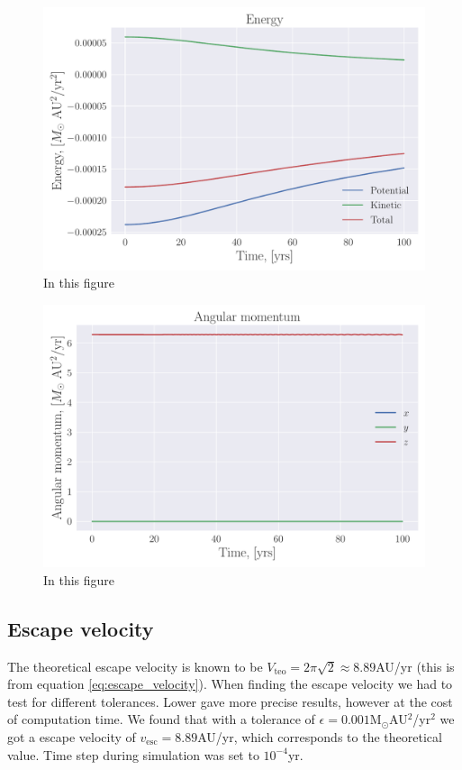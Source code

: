 \documentclass[reprint, english,notitlepage,nofootinbib]{revtex4-1}  %
\begin{document}
\begin{figure}[h]
	\centering
	\includegraphics[width=\linewidth]{../output/earth_sun_circ-verlet-3-5-3_energy.pdf}
	\caption{In this figure 
		\label{fig:betha=3_energy}}
\end{figure}

\begin{figure}[h]
	\centering
	\includegraphics[width=\linewidth]{../output/earth_sun_circ-verlet-3-5-3_ang_mom.pdf}
	\caption{In this figure 
		\label{fig:4}}
\end{figure}

\subsection{Escape velocity}
The theoretical escape velocity is known to be $V_{\text{teo}} = 2\pi\sqrt{2} \approx 8.89$AU/yr (this is from equation \eqref{eq:escape_velocity}). When finding the escape velocity we had to test for different tolerances. Lower gave more precise results, however at the cost of computation time. We found that with a tolerance of $\epsilon = 0.001$M$_\odot$AU$^2$/yr$^2$ we got a escape velocity of $v_{\text{esc}} = 8.89$AU/yr, which corresponds to the theoretical value. Time step during simulation was set to $10^{-4}$yr.
\end{document}
